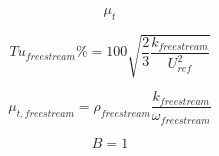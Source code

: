 {\newpage\clearpage
{}%
\begin{displaymath}
\mu_t
\end{displaymath}%
\lthtmldisplayZ
\lthtmlcheckvsize\clearpage}

{\newpage\clearpage
{}%
\begin{displaymath}
Tu_{freestream}\% = 100 \sqrt{\frac{2}{3} \frac{k_{freestream}}{U_{ref}^2}}
\end{displaymath}%
\lthtmldisplayZ
\lthtmlcheckvsize\clearpage}

{\newpage\clearpage
{}%
\begin{displaymath}
\mu_{t, freestream} = \rho_{freestream}\frac{k_{freestream}}{\omega_{freestream}}
\end{displaymath}%
\lthtmldisplayZ
\lthtmlcheckvsize\clearpage}

{\newpage\clearpage
{}%
\begin{displaymath}
B=1
\end{displaymath}%
\lthtmldisplayZ
\lthtmlcheckvsize\clearpage}



